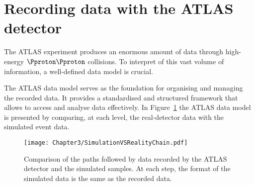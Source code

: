 \section{Recording data with the ATLAS detector}
\label{sec:Chap3.1:Data}

The ATLAS experiment produces an enormous amount of 
data through high-energy $\Pproton \Pproton$ collisions. To
interpret of this vast volume of information, a well-defined data 
model is crucial. %

The ATLAS data model serves as the foundation for organising 
and managing the recorded data. It provides a standardised and structured framework 
that allows to access and analyse data effectively. %
In Figure~\ref{fig:Chap3:SimVsReal} the ATLAS data model is presented
by comparing, at each level, the real-detector data with the simulated event data.

 \begin{figure}
    \centering
    \texttt{[image: Chapter3/SimulationVSRealityChain.pdf]}
    \caption{Comparison of the paths followed by data recorded by the ATLAS detector and the simulated samples.
    At each step, the format of the simulated data is the same as the recorded data.}
    \label{fig:Chap3:SimVsReal}
\end{figure}







